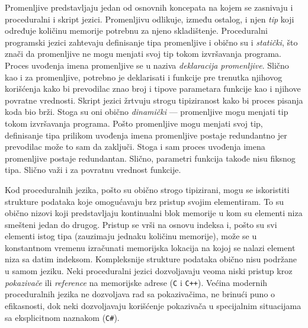 Promenljive predstavljaju jedan od osnovnih koncepata na kojem se zasnivaju i proceduralni i skript jezici. Promenljivu odlikuje, između ostalog, i njen \emph{tip} koji određuje količinu memorije potrebnu za njeno skladištenje. Proceduralni programski jezici zahtevaju definisanje tipa promenljive i obično su i \emph{statički}, što znači da promenljive ne mogu menjati svoj tip tokom izvršavanja programa. Proces uvođenja imena promenljive se u naziva \emph{deklaracija promenljive}. Slično kao i za promenljive, potrebno je deklarisati i funkcije pre trenutka njihovog korišćenja kako bi prevodilac znao broj i tipove parametara funkcije kao i njihove povratne vrednosti. Skript jezici žrtvuju strogu tipiziranost kako bi proces pisanja koda bio brži. Stoga su oni obično \emph{dinamički} --- promenljive mogu menjati tip tokom izvršavanja programa. Pošto promenljive mogu menjati svoj tip, definisanje tipa prilikom uvođenja imena promenljive postaje redundantno jer prevodilac može to sam da zaključi. Stoga i sam proces uvođenja imena promenljive postaje redundantan. Slično, parametri funkcija takođe nisu fiksnog tipa. Slično važi i za povratnu vrednost funkcije.

Kod proceduralnih jezika, pošto su obično strogo tipizirani, mogu se iskoristiti strukture podataka koje omogućavaju brz pristup svojim elementiram. To su obično nizovi koji predstavljaju kontinualni blok memorije u kom su elementi niza smešteni jedan do drugog. Pristup se vrši na osnovu indeksa i, pošto su svi elementi istog tipa (zauzimaju jednaku količinu memorije), može se u konstantnom vremenu izračunati memorijska lokacija na kojoj se nalazi element niza sa datim indeksom. Kompleksnije strukture podataka obično nisu podržane u samom jeziku. Neki proceduralni jezici dozvoljavaju veoma niski pristup kroz \emph{pokazivače} ili \emph{reference} na memorijske adrese (\texttt{C} i \texttt{C++}). Većina modernih proceduralnih jezika ne dozvoljava rad sa pokazivačima, ne brinući puno o efikasnosti, dok neki dozvoljavaju korišćenje pokazivača u specijalnim situacijama sa eksplicitnom naznakom (\texttt{C\#}).


